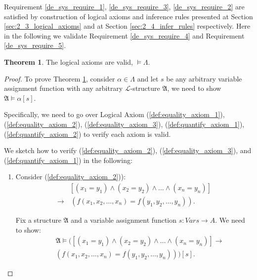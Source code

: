 \documentclass[11pt,letterpaper]{book}
\theoremstyle{definition}
\newtheorem{theorem}{Theorem}[section]
\begin{document}
Requirement \ref{de_sys_require_1}, \ref{de_sys_require_3},
\ref{de_sys_require_2} are satisfied by construction of logical axioms
and inference rules presented at Section \ref{sec:2_3_logical_axioms}
and at Section \ref{sec:2_4_infer_rules} respectively. Here in the
following we validate Requirement \ref{de_sys_require_4} and Requirement
\ref{de_sys_require_5}.


\begin{theorem}
The logical axioms are valid, $\models \Lambda
$.\label{theorem:valid_logical_axiom}
\end{theorem}

\begin{proof}

To prove Theorem \ref{theorem:valid_logical_axiom}, consider $\alpha \in
\Lambda$ and let $s$ be any arbitrary variable assignment function with
any arbitrary $\mathcal{L}$-structure $\mathfrak{A}$, we need to show
$\mathfrak{A} \models \alpha[s] $.

Specifically, we need to go over Logical Axiom
(\ref{def:equality_axiom_1}), (\ref{def:equality_axiom_2}),
(\ref{def:equality_axiom_3}), (\ref{def:quantify_axiom_1}),
(\ref{def:quantify_axiom_2}) to verify each axiom is valid.

We sketch how to verify (\ref{def:equality_axiom_2}),
(\ref{def:equality_axiom_3}), and (\ref{def:quantify_axiom_1}) in the
following:
\begin{enumerate}
\item{Consider (\ref{def:equality_axiom_2})):
\begin{equation}
\begin{aligned}
&  [(x_1 = y_1) \land (x_2=y_2) \land \ldots \land (x_n=y_n) ] \\
\rightarrow & \, ( f(x_1, x_2, \ldots, x_n) = f(y_1, y_2, \ldots, y_n) ).
\end{aligned} \nonumber
\end{equation}

Fix a structure $\mathfrak{A}$ and a variable assignment function $s:
Vars \rightarrow A$. We need to show:
\begin{equation}
\begin{aligned}
& & \mathfrak{A} \models \bigg( [(x_1 = y_1) \land (x_2=y_2) \land
\ldots \land (x_n=y_n) ] \rightarrow \\
&  & ( f(x_1, x_2, \ldots, x_n) = f(y_1, y_2, \ldots, y_n) ) \bigg) [s].
\end{aligned} \nonumber
\end{equation}

}
\end{enumerate}
\end{proof}
\end{document}

